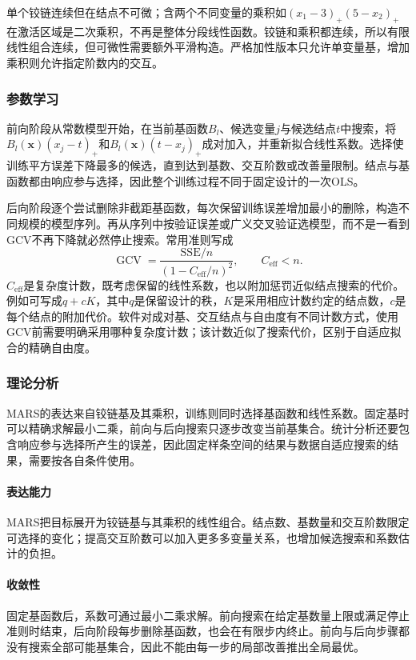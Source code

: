 单个铰链连续但在结点不可微；含两个不同变量的乘积如$(x_1-3)_+(5-x_2)_+$在激活区域是二次乘积，不再是整体分段线性函数。铰链和乘积都连续，所以有限线性组合连续，但可微性需要额外平滑构造。严格加性版本只允许单变量基，增加乘积则允许指定阶数内的交互。

\subsubsection{参数学习}

前向阶段从常数模型开始，在当前基函数$B_l$、候选变量$j$与候选结点$t$中搜索，将$B_l(\bm{x})(x_j-t)_+$和$B_l(\bm{x})(t-x_j)_+$成对加入，并重新拟合线性系数。选择使训练平方误差下降最多的候选，直到达到基数、交互阶数或改善量限制。结点与基函数都由响应参与选择，因此整个训练过程不同于固定设计的一次OLS。

后向阶段逐个尝试删除非截距基函数，每次保留训练误差增加最小的删除，构造不同规模的模型序列。再从序列中按验证误差或广义交叉验证选模型，而不是一看到GCV不再下降就必然停止搜索。常用准则写成
\begin{equation}
  \operatorname{GCV}
  =\frac{\mathrm{SSE}/n}{(1-C_{\mathrm{eff}}/n)^2},
  \qquad C_{\mathrm{eff}}<n.
  \label{eq:regression-mars-gcv}
\end{equation}
$C_{\mathrm{eff}}$是复杂度计数，既考虑保留的线性系数，也以附加惩罚近似结点搜索的代价。例如可写成$q+cK$，其中$q$是保留设计的秩，$K$是采用相应计数约定的结点数，$c$是每个结点的附加代价。软件对成对基、交互结点与自由度有不同计数方式，使用GCV前需要明确采用哪种复杂度计数；该计数近似了搜索代价，区别于自适应拟合的精确自由度。

\subsubsection{理论分析}

MARS的表达来自铰链基及其乘积，训练则同时选择基函数和线性系数。固定基时可以精确求解最小二乘，前向与后向搜索只逐步改变当前基集合。统计分析还要包含响应参与选择所产生的误差，因此固定样条空间的结果与数据自适应搜索的结果，需要按各自条件使用。

\paragraph{表达能力}
MARS把目标展开为铰链基与其乘积的线性组合。结点数、基数量和交互阶数限定可选择的变化；提高交互阶数可以加入更多多变量关系，也增加候选搜索和系数估计的负担。

\paragraph{收敛性}
固定基函数后，系数可通过最小二乘求解。前向搜索在给定基数量上限或满足停止准则时结束，后向阶段每步删除基函数，也会在有限步内终止。前向与后向步骤都没有搜索全部可能基集合，因此不能由每一步的局部改善推出全局最优。

